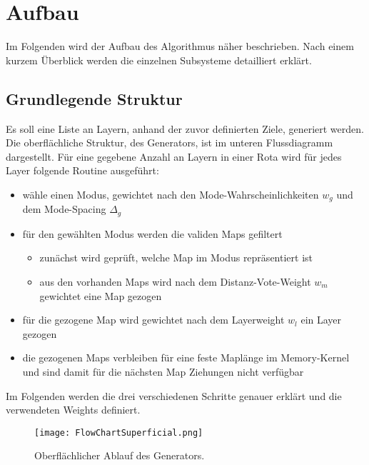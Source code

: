 \section{Aufbau}
    Im Folgenden wird der Aufbau des Algorithmus näher beschrieben. 
    Nach einem kurzem Überblick werden die einzelnen Subsysteme detailliert erklärt.
    \subsection{Grundlegende Struktur}

    Es soll eine Liste an Layern, anhand der zuvor definierten Ziele, generiert werden.
    Die oberflächliche Struktur, des Generators, ist im unteren Flussdiagramm dargestellt.
    Für eine gegebene Anzahl an Layern in einer Rota wird für jedes Layer folgende Routine ausgeführt:

    \begin{itemize}
        \item wähle einen Modus, gewichtet nach den Mode-Wahrscheinlichkeiten $w_g$ und dem Mode-Spacing $\Delta_g$
        \item für den gewählten Modus werden die validen Maps gefiltert
        \begin{itemize}
            \item zunächst wird geprüft, welche Map im Modus repräsentiert ist
            \item aus den vorhanden Maps wird nach dem Distanz-Vote-Weight $w_m$ gewichtet eine Map gezogen
        \end{itemize}
        \item für die gezogene Map wird gewichtet nach dem Layerweight $w_l$ ein Layer gezogen
        \item die gezogenen Maps verbleiben für eine feste Maplänge im Memory-Kernel und sind damit für die nächsten Map Ziehungen nicht verfügbar
    \end{itemize}
    Im Folgenden werden die drei verschiedenen Schritte genauer erklärt und die verwendeten Weights definiert. 
    \begin{figure}[htbp]
        \centering
        \texttt{[image: FlowChartSuperficial.png]}
        \caption{Oberflächlicher Ablauf des Generators.}
    \end{figure}

